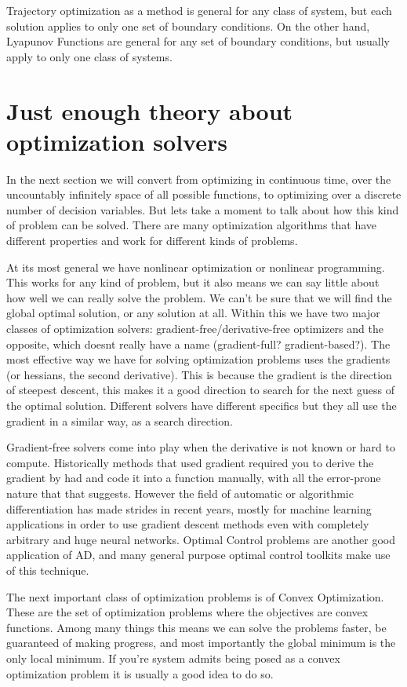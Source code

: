 \documentclass[a4paper, 10pt, twocolumn]{article}
\begin{document}
Trajectory optimization as a method is general for any class of system, but each solution applies to only one set of boundary conditions. On the other hand, Lyapunov Functions are general for any set of boundary conditions, but usually apply to only one class of systems.

\section{Just enough theory about optimization solvers}

In the next section we will convert from optimizing in continuous time, over the uncountably infinitely space of all possible functions, to optimizing over a discrete number of decision variables. But lets take a moment to talk about how this kind of problem can be solved. There are many optimization algorithms that have different properties and work for different kinds of problems.

At its most general we have nonlinear optimization or nonlinear programming. This works for any kind of problem, but it also means we can say little about how well we can really solve the problem. We can't be sure that we will find the global optimal solution, or any solution at all. Within this we have two major classes of optimization solvers: gradient-free/derivative-free optimizers and the opposite, which doesnt really have a name (gradient-full? gradient-based?). The most effective way we have for solving optimization problems uses the gradients (or hessians, the second derivative). This is because the gradient is the direction of steepest descent, this makes it a good direction to search for the next guess of the optimal solution. Different solvers have different specifics but they all use the gradient in a similar way, as a search direction.

Gradient-free solvers come into play when the derivative is not known or hard to compute. Historically methods that used gradient required you to derive the gradient by had and code it into a function manually, with all the error-prone nature that that suggests. However the field of automatic or algorithmic differentiation has made strides in recent years, mostly for machine learning applications in order to use gradient descent methods even with completely arbitrary and huge neural networks. Optimal Control problems are another good application of AD, and many general purpose optimal control toolkits make use of this technique.

The next important class of optimization problems is of Convex Optimization. These are the set of optimization problems where the objectives are convex functions. Among many things this means we can solve the problems faster, be guaranteed of making progress, and most importantly the global minimum is the only local minimum. If you're system admits being posed as a convex optimization problem it is usually a good idea to do so.
\end{document}
